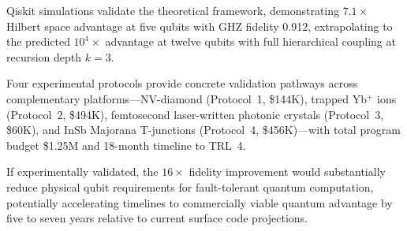 \documentclass[aps,prx,twocolumn,groupedaddress,longbibliography]{revtex4-2}
\theoremstyle{plain}
\theoremstyle{definition}
\begin{document}
Qiskit simulations validate the theoretical framework, demonstrating $7.1\times$ Hilbert space advantage at five qubits with GHZ fidelity 0.912, extrapolating to the predicted $10^4\times$ advantage at twelve qubits with full hierarchical coupling at recursion depth $k = 3$.

Four experimental protocols provide concrete validation pathways across complementary platforms---NV-diamond (Protocol~1, \$144K), trapped Yb$^+$ ions (Protocol~2, \$494K), femtosecond laser-written photonic crystals (Protocol~3, \$60K), and InSb Majorana T-junctions (Protocol~4, \$456K)---with total program budget \$1.25M and 18-month timeline to TRL~4.

If experimentally validated, the $16\times$ fidelity improvement would substantially reduce physical qubit requirements for fault-tolerant quantum computation, potentially accelerating timelines to commercially viable quantum advantage by five to seven years relative to current surface code projections.






\end{document}
